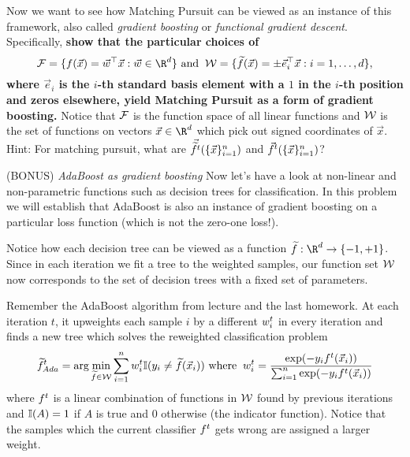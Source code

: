 \documentclass[preview]{standalone}
\begin{document}
\begin{Parts}
Now we want to see how Matching Pursuit can be viewed as an instance
of this framework, also called \emph{gradient boosting} or
\emph{functional gradient descent}.  Specifically, {\bf show that the particular
  choices of
\begin{equation*}
  \Fspace = \{\Func(\vec{x}) = \vec{w}^\top \vec{x} : \vec{w} \in \R^d\} \text{ and }\:
  \weakspace = \{\func(\vec{x}) = \pm \vec{e}_i^\top \vec{x} : i = 1, \dots, d\},
\end{equation*}
where $\vec{e}_i$ is the $i$-th standard basis element with a $1$ in
the $i$-th position and zeros elsewhere, yield Matching Pursuit as a form of gradient boosting.} Notice that $\mathcal{F}$ is the function space of all linear functions and $\mathcal{W}$ is the set of functions on vectors $\vec{x} \in \R^d$ which pick out signed coordinates of $\vec{x}$. \\


Hint: For matching pursuit, what are $\vec{\widetilde{f}^{t}}(\{\vec{x}\}_{i=1}^n)$ and $\vec{f}^t(\{\vec{x}\}_{i=1}^n)$? 



\Part (BONUS) \emph{AdaBoost as gradient boosting} Now let's have a
  look at non-linear and non-parametric functions such as decision
  trees for classification. In this problem we will establish that
  AdaBoost is also an instance of gradient boosting on a
  particular loss function (which is not the zero-one loss!).

Notice how each decision tree can be viewed as a function $\func: \R^d
\to \{-1,+1\}$. Since in each iteration we fit a tree to the weighted
samples, our function set $\mathcal{W}$ now corresponds to the set
of decision trees with a fixed set of parameters.

Remember the AdaBoost algorithm from lecture and the last homework.
At each iteration $t$, it upweights each sample $i$ by a different
$w_{i}^{t}$ in every iteration and finds a new
tree which solves the reweighted classification problem
\begin{equation*}
\widetilde{f}^{t}_{Ada} =  \arg \min_{\widetilde{f} \in \mathcal{W}} \sum_{i=1}^n w_{i}^{t} \mathbb{I}(y_i\neq \widetilde{f}(\vec{x}_i))
 \text{ where } \: w_{i}^{t} = \frac{\exp(-y_i f^t(\vec{x}_i))}{\sum_{i=1}^n \exp(-y_i f^t(\vec{x}_i))}
\end{equation*}
where $f^t$ is a linear combination of functions in $\mathcal{W}$
found by previous iterations and $\mathbb{I}(A) = 1$ if $A$ is true and $0$
otherwise (the indicator function). Notice that the samples which the
current classifier $f^t$ gets wrong are assigned a larger weight.


\end{Parts}
\end{document}
